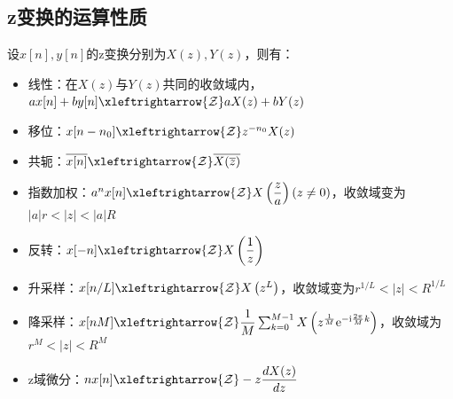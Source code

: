 \subsection{z变换的运算性质}\label{sub:z_operation}
\begin{proposition}[z变换的运算性质]
    设$x[n],y[n]$的z变换分别为$X(z),Y(z)$，则有：
    \begin{itemize}
        \item 线性：在$X(z)$与$Y(z)$共同的收敛域内，$a x[n]+b y[n]\xleftrightarrow{\mathcal{Z}} a X(z)+b Y(z)$
        \item 移位：$x[n-n_0]\xleftrightarrow{\mathcal{Z}} z^{-n_0}X(z)$
        \item 共轭：$\overline{x[n]}\xleftrightarrow{\mathcal{Z}} \overline{X(\overline{z})}$
        \item 指数加权：$a^{n} x[n]\xleftrightarrow{\mathcal{Z}} X\left(\dfrac{z}{a}\right)(z\neq 0)$，收敛域变为$|a|r<|z|<|a|R$
        \item 反转：$x[-n]\xleftrightarrow{\mathcal{Z}} X\left(\dfrac{1}{z}\right)$
        \item 升采样：$x[n/L]\xleftrightarrow{\mathcal{Z}} X\left(z^{L}\right)$，收敛域变为$r^{1/L}<|z|<R^{1/L}$
        \item 降采样：$x[nM]\xleftrightarrow{\mathcal{Z}} \dfrac{1}{M}\sum_{k=0}^{M-1}X\left(z^{\frac{1}{M}}\mathrm{e}^{-\mathrm{i}\frac{2\pi}{M}k}\right)$，收敛域为$r^{M}<|z|<R^{M}$
        \item z域微分：$n x[n]\xleftrightarrow{\mathcal{Z}} -z\dfrac{dX(z)}{dz}$
    \end{itemize}
\end{proposition}
